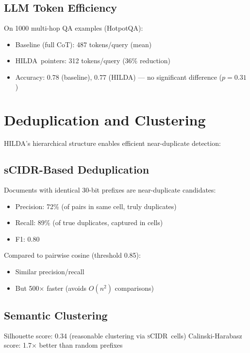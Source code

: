 \documentclass[11pt]{article}
\newcommand{\hilda}{\textsc{HILDA}}
\newcommand{\scidr}{\textsc{sCIDR}}
\begin{document}
\subsection{LLM Token Efficiency}

On 1000 multi-hop QA examples (HotpotQA):
\begin{itemize}
  \item Baseline (full CoT): 487 tokens/query (mean)
  \item \hilda\ pointers: 312 tokens/query (36\% reduction)
  \item Accuracy: 0.78 (baseline), 0.77 (\hilda) --- no significant difference ($p = 0.31$)
\end{itemize}

\section{Deduplication and Clustering}

\hilda's hierarchical structure enables efficient near-duplicate detection:

\subsection{sCIDR-Based Deduplication}

Documents with identical 30-bit prefixes are near-duplicate candidates:
\begin{itemize}
  \item Precision: 72\% (of pairs in same cell, truly duplicates)
  \item Recall: 89\% (of true duplicates, captured in cells)
  \item F1: 0.80
\end{itemize}

Compared to pairwise cosine (threshold 0.85):
\begin{itemize}
  \item Similar precision/recall
  \item But 500$\times$ faster (avoids $O(n^2)$ comparisons)
\end{itemize}

\subsection{Semantic Clustering}

Silhouette score: 0.34 (reasonable clustering via \scidr\ cells)  
Calinski-Harabasz score: 1.7$\times$ better than random prefixes
\end{document}
